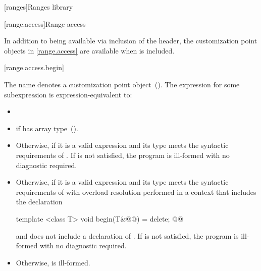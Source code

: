 \setcounter{chapter}{28}
[ranges]{Ranges library}

\setcounter{section}{4}
[range.access]{Range access}

\pnum
In addition to being available via inclusion of the 
header, the customization point objects in \ref{range.access} are
available when  is included.

[range.access.begin]{}

\pnum
The name  denotes a customization point
 object~(). The expression
  for some subexpression  is
 expression-equivalent to:

\begin{itemize}
\item

\item
   if  has array
  type~().

\item
  Otherwise, 
   if it is a valid expression and its
  type  meets the syntactic requirements of . If
   is not satisfied, the program is ill-formed with no
  diagnostic required.

\item
  Otherwise,  if it is a valid expression
  and its type  meets the syntactic requirements of 
  with overload resolution performed in a context that includes the
   declaration
  \begin{codeblock}
  template <class T> void begin(T&@\added{\&}@) = delete;
  @@
  \end{codeblock}
  and does not include a declaration of . If
   is not satisfied, the program is ill-formed with no
  diagnostic required.

\item
  Otherwise,  is ill-formed.
\end{itemize}

